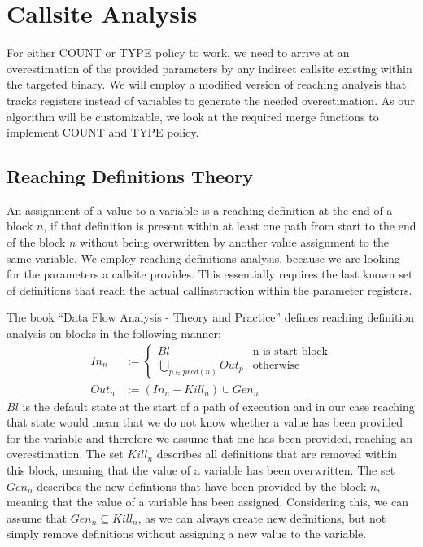 \section{Callsite Analysis}
\label{section:callsiteanalysis}
For either COUNT or TYPE policy to work, we need to arrive at an overestimation of the provided parameters by any indirect callsite existing within the targeted binary. We will employ a modified version of reaching analysis that tracks registers instead of variables to generate the needed overestimation. As our algorithm will be customizable, we look at the required merge functions to implement COUNT and TYPE policy. 

\subsection{Reaching Definitions Theory}
\label{subsection:reachindefinitionstheory}

An assignment of a value to a variable is a reaching definition at the end of a block $n$, if that definition is present within at least one path from start to the end of the block $n$ without being overwritten by another value assignment to the same variable. We employ reaching definitions analysis, because we are looking for the parameters a callsite provides. This essentially requires the last known set of definitions that reach the actual callinstruction within the parameter registers.

The book ``Data Flow Analysis - Theory and Practice'' \cite{dataflowanalysis} defines reaching definition analysis on blocks in the following manner:
\begin{subequations}
\label{eq:reachingbasedef}
\begin{align}
In_n &:= \left\{
  \begin{array}{lr}
    Bl & \text{n is start block}\\
    \underset{p \in pred(n)}{\bigcup} Out_p & \text{otherwise}
  \end{array}
\right. \label{eq:reachingbasedefInt}\\
Out_n &:= (In_n - Kill_n) \cup Gen_n \label{eq:reachingbasedefOut}
\end{align}
\end{subequations}
$Bl$ is the default state at the start of a path of execution and in our case reaching that state would mean that we do not know whether a value has been provided for the variable and therefore we assume that one has been provided, reaching an overestimation. The set $Kill_n$ describes all definitions that are removed within this block, meaning that the value of a variable has been overwritten. The set $Gen_n$ describes the new defintions that have been provided by the block $n$, meaning that the value of a variable has been assigned. Considering this, we can assume that $Gen_n \subseteq Kill_n$, as we can always create new definitions, but not simply remove definitions without assigning a new value to the variable.


